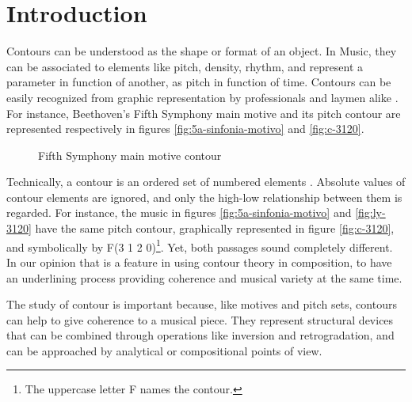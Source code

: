 

\section{Introduction}
\label{sec:introduction}

Contours can be understood as the shape or format of an object. In
Music, they can be associated to elements like pitch, density, rhythm,
and represent a parameter in function of another, as pitch in function
of time. Contours can be easily recognized from graphic representation
by professionals and laymen alike \cite{marvin88:generalized}. For
instance, Beethoven's Fifth Symphony main motive and its pitch contour
are represented respectively in figures \ref{fig:5a-sinfonia-motivo}
and \ref{fig:c-3120}.

\begin{figure}[h!]
  \centering

  \subfloat[Contour F(3 1 2 0)]{
    \texttt{[image: c-3120]}
    \label{fig:c-3120}
  }
  \caption{Fifth Symphony main motive contour}
  \label{fig:5a-sinfonia}
\end{figure}

Technically, a contour is an ordered set of numbered elements
\cite{morris93:directions}. Absolute values of contour elements are
ignored, and only the high-low relationship between them is regarded.
For instance, the music in figures \ref{fig:5a-sinfonia-motivo} and
\ref{fig:ly-3120} have the same pitch contour, graphically represented
in figure \ref{fig:c-3120}, and symbolically by F(3 1 2
0)\footnote{The uppercase letter F names the contour.}. Yet, both
passages sound completely different. In our opinion that is a feature
in using contour theory in composition, to have an underlining process
providing coherence and musical variety at the same time.

The study of contour is important because, like motives and pitch
sets, contours can help to give coherence to a musical piece. They
represent structural devices that can be combined through operations
like inversion and retrogradation, and can be approached by analytical
or compositional points of view.

